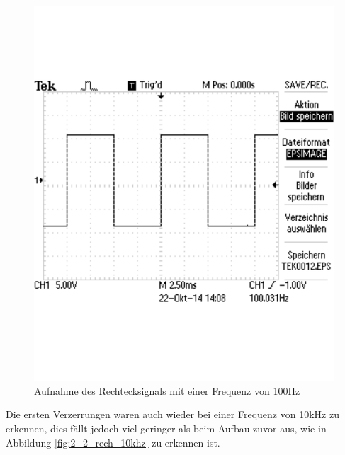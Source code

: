 \documentclass[12pt,a4paper]{article}
\begin{document}
\begin{figure}[H] 
  \centering
    \includegraphics[scale = 0.4]{2_2_rech_100hz.pdf}
  	\caption[Aufnahme des Rechtecksignals mit einer Frequenz von 100Hz]{Aufnahme des Rechtecksignals mit einer Frequenz von 100Hz}
  \label{fig:2_2_rech_100hz}
\end{figure}

Die ersten Verzerrungen waren auch wieder bei einer Frequenz von 10kHz zu erkennen, dies fällt jedoch viel geringer als beim Aufbau zuvor aus, wie in Abbildung \ref{fig:2_2_rech_10khz} zu erkennen ist.
\end{document}
